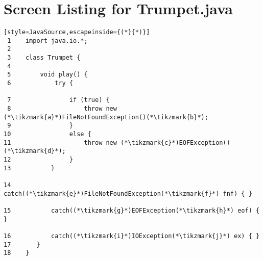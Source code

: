 \documentclass{article}
\begin{document}
\section*{Screen Listing for Trumpet.java}



\begin{lstlisting}[style=JavaSource,escapeinside={(*}{*)}]
 1    import java.io.*;
 2
 3    class Trumpet {
 4
 5        void play() {
 6            try {
            
 7                if (true) {
 8                    throw new (*\tikzmark{a}*)FileNotFoundException()(*\tikzmark{b}*);
 9                }
10                else {
11                    throw new (*\tikzmark{c}*)EOFException()(*\tikzmark{d}*);
12                }
13           }
        
14           catch((*\tikzmark{e}*)FileNotFoundException(*\tikzmark{f}*) fnf) { }
        
15           catch((*\tikzmark{g}*)EOFException(*\tikzmark{h}*) eof) { }
        
16           catch((*\tikzmark{i}*)IOException(*\tikzmark{j}*) ex) { }
17       }
18    }
\end{lstlisting}
\end{document}
